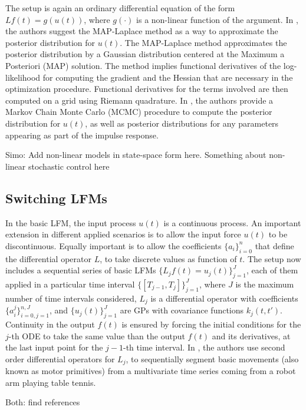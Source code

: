\documentclass[journal]{IEEEtran}
\newcommand{\simo}[1]{{\color{red}#1}}
\begin{document}
The setup is again an ordinary differential equation of the form $Lf(t)=g(u(t))$, where $g(\cdot)$ is a non-linear function
of the argument. In \cite{Lawrence:gpsim2007a, Gao:latent08}, the authors suggest the MAP-Laplace method
\cite{Bishop:PRML06} as a way to approximate the posterior distribution for $u(t)$. The MAP-Laplace method approximates
the posterior distribution by a
Gaussian distribution centered at the Maximum a Posteriori (MAP) solution. The method implies functional derivatives of the
log-likelihood for computing the gradient and the Hessian that are necessary in the optimization procedure. Functional
derivatives for the terms involved are then computed on a grid using Riemann quadrature. In \cite{Titsias:BMC:2012}, the
authors provide a Markov Chain Monte Carlo (MCMC) procedure to compute the posterior distribution for $u(t)$, as well
as posterior distributions for any parameters appearing as part of the impulse response.

\simo{Simo: Add non-linear models in state-space form here. Something about non-linear stochastic control here}


\subsection{Switching LFMs}

In the basic LFM, the input process $u(t)$ is a continuous process. An important extension in different applied scenarios
is to allow the input force $u(t)$ to be discontinuous. Equally important is to allow the coefficients $\{a_i\}_{i=0}^n$ that
define the differential operator $L$, to take discrete values as function of $t$. The setup now includes a sequential
series of basic LFMs $\{L_jf(t) = u_j(t)\}_{j=1}^J$, each of them applied in a particular time interval
$\{[T_{j-1}, T_j]\}_{j=1}^J$, where $J$ is the maximum number of time intervals considered, $L_j$ is a differential operator
with coefficients $\{a_i^j\}_{i=0,j=1}^{n, J}$, and $\{u_j(t)\}_{j=1}^J$ are GPs with covariance functions $k_j(t,t')$.
Continuity in the output $f(t)$ is ensured by forcing the initial conditions for the $j$-th ODE to take the same value
than the output $f(t)$ and its derivatives, at the last input point for the $j-1$-th time interval.
In \cite{Alvarez:switched11}, the authors use second order differential operators for $L_j$, to sequentially segment
basic movements (also known as motor primitives) from a multivariate time series coming from a robot arm playing table
tennis.

\simo{Both: find references}
\end{document}
